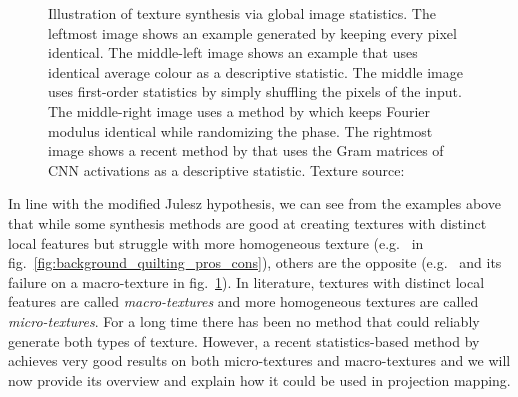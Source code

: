 \begin{figure}[ht]
    \centering
    \caption{Illustration of texture synthesis via global image statistics. The leftmost image shows an example generated by keeping every pixel identical. The middle-left image shows an example that uses identical average colour as a descriptive statistic. The middle image uses first-order statistics by simply shuffling the pixels of the input. The middle-right image uses a method by \citet{Galerne2011} which keeps Fourier modulus identical while randomizing the phase. The rightmost image shows a recent method by \citet{Gatys2015} that uses the Gram matrices of CNN activations as a descriptive statistic. Texture source: \citet{Gatys2015}}
    \label{fig:background_statistics_example}
\end{figure}

In line with the modified Julesz hypothesis, we can see from the examples above that while some synthesis methods are good at creating textures with distinct local features but struggle with more homogeneous texture (e.g.~\citet{Efros2001} in fig.~\ref{fig:background_quilting_pros_cons}), others are the opposite (e.g.~\citet{Galerne2011} and its failure on a macro-texture in fig.~\ref{fig:background_statistics_example}). In literature, textures with distinct local features are called \textit{macro-textures} and more homogeneous textures are called \textit{micro-textures}. For a long time there has been no method that could reliably generate both types of texture. However, a recent statistics-based method by \citet{Gatys2015} achieves very good results on both micro-textures and macro-textures and we will now provide its overview and explain how it could be used in projection mapping.

